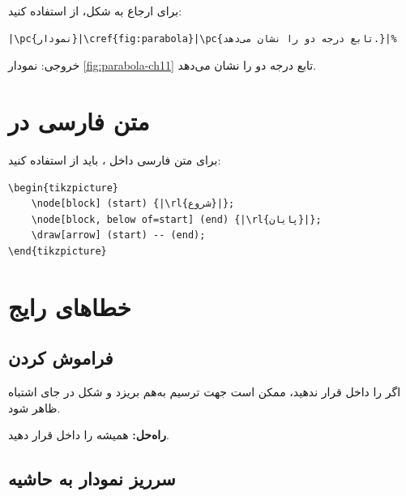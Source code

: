 برای ارجاع به شکل، از  استفاده کنید:

\begin{latin}
\begin{verbatim}
|\pc{نمودار}|\cref{fig:parabola}|\pc{تابع درجه دو را نشان می‌دهد.}|%
\end{verbatim}
\end{latin}

خروجی: نمودار \cref{fig:parabola-ch11} تابع
درجه دو را نشان می‌دهد.


\section{متن فارسی در }
\label{sec:graphics-persian}

برای متن فارسی داخل ، باید از
 استفاده کنید:

\begin{latin}
\begin{verbatim}
\begin{tikzpicture}
    \node[block] (start) {|\rl{شروع}|};
    \node[block, below of=start] (end) {|\rl{پایان}|};
    \draw[arrow] (start) -- (end);
\end{tikzpicture}
\end{verbatim}
\end{latin}


\section{خطاهای رایج}
\label{sec:graphics-mistakes}

\subsection{فراموش کردن }
\label{sec:graphics-mistake-latin}

اگر  را داخل  قرار
ندهید، ممکن است جهت ترسیم به‌هم بریزد و
شکل در جای اشتباه ظاهر شود.

\textbf{راه‌حل:} همیشه  را داخل
 قرار دهید.

\subsection{سرریز نمودار به حاشیه}
\label{sec:graphics-mistake-overflow}

